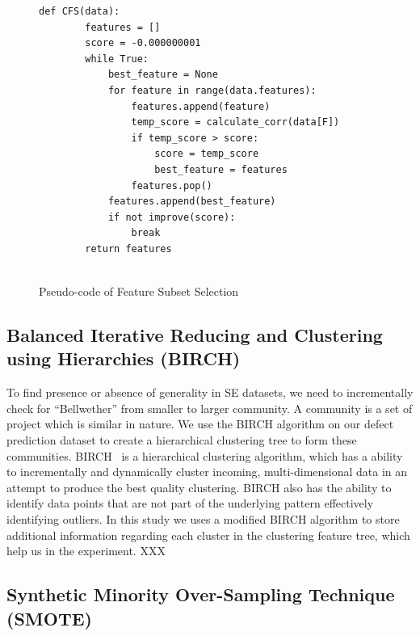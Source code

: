 \documentclass[sigconf,review]{acmart}
\theoremstyle{break}
\begin{document}
\small{
\begin{figure}[]
    \small
     \begin{lstlisting}[mathescape,linewidth=7.5cm,frame=none,numbers=right]
      def CFS(data):
        features = []
        score = -0.000000001
        while True:
            best_feature = None
            for feature in range(data.features):
                features.append(feature)
                temp_score = calculate_corr(data[F])
                if temp_score > score:
                    score = temp_score
                    best_feature = features
                features.pop()
            features.append(best_feature)
            if not improve(score):
                break
        return features
    
    \end{lstlisting} 
    \vspace{-0.2cm}
    \caption{Pseudo-code of Feature Subset Selection}
    \label{fig:GAP_pseudocode} 
    \vspace{-0.3cm}
\end{figure}
}
\subsection{Balanced Iterative Reducing and Clustering using Hierarchies (BIRCH)}
\label{subsec:BIRCH}
To find presence or absence of generality in SE datasets, we need to incrementally check for ``Bellwether'' from smaller to larger community. A community is a set of project which is similar in nature. We use the BIRCH algorithm on our defect prediction dataset to create a hierarchical clustering tree to form these communities. BIRCH~\cite{zhang1996birch} is  a hierarchical clustering algorithm, which has a ability to incrementally and dynamically cluster incoming, multi-dimensional data in an attempt to produce the best quality clustering. BIRCH also has the ability to identify data points that are not part of the underlying pattern effectively identifying outliers. In this study we uses a modified BIRCH algorithm to store additional information regarding each cluster in the clustering feature tree, which help us in the experiment. XXX

\subsection{Synthetic Minority Over-Sampling Technique (SMOTE)}
\label{subsec:SMOTE}
\end{document}
